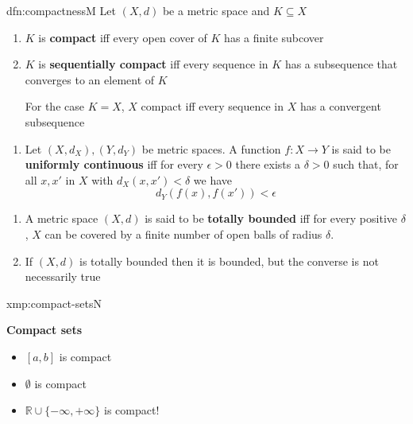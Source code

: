 \documentclass[landscape, 8pt]{extarticle}
\begin{document}
\begin{multicols}{3}
\begin{dfn}{dfn:compactness}{M}
    Let $(X, d)$ be a metric space and $K \subseteq X$
    \vspace{-5pt}
    \begin{enumerate}[leftmargin=*]
        \item $K$ is \textbf{compact} iff every open cover of $K$ has a finite subcover
        \item $K$ is \textbf{sequentially compact} iff every sequence in $K$ has a subsequence that converges to an element of $K$

            For the case $K = X$, $X$ compact iff every sequence in $X$ has a convergent subsequence
    \end{enumerate}

    \vspace{-5pt}
    \vspace{-8pt}
    \begin{enumerate}[leftmargin=*]
        \item[3.] Let $(X, d_{X}), (Y, d_{Y})$ be metric spaces. A function $f : X \to Y$ is said to be \textbf{uniformly continuous} iff for every $\epsilon>0$ there exists a $\delta>0$ such that, for all $x, x'$ in $X$ with $d_{X}(x, x') < \delta$ we have
            \[d_{Y}(f(x), f(x')) < \epsilon\]
    \end{enumerate}

    \vspace{-3pt}
    \vspace{-8pt}
    \begin{enumerate}[leftmargin=*]
        \item[\textbf{117}:] A metric space $(X, d)$ is said to be \textbf{totally bounded} iff for every positive $\delta$, $X$ can be covered by a finite number of open balls of radius $\delta$.
        \item[\textbf{118}:] If $(X, d)$ is totally bounded then it is bounded, but the converse is not necessarily true
    \end{enumerate}
    
\end{dfn}

\begin{xmp}{xmp:compact-sets}{N}
    \vspace{-16pt}
    \setlength{\columnseprule}{0.5pt}
    \begin{multicols}{2}
        \textbf{Compact sets}
        \vspace{-5pt}
        \begin{itemize}[leftmargin=*]
            \item $[a, b]$ is compact
            \item $\emptyset$ is compact
            \item $\mathbb{R} \cup \{-\infty, +\infty\}$ is compact!
        \end{itemize}


\end{multicols}
\end{xmp}
\end{multicols}
\end{document}
